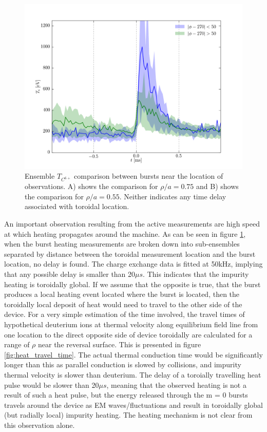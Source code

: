 \begin{figure}
	\centering
	\includegraphics[width = 1.\linewidth]{./m0_and_impurity_heating/m0_no_delay.png}
	\caption{Ensemble $T_{C^{6+}}$ comparison between bursts near the location of observations. A) shows the comparison for $\rho/a = 0.75$ and B) shows the comparison for $\rho/a = 0.55$. Neither indicates any time delay associated with toroidal location.}\label{fig:m0_no_delay}
\end{figure}


An important observation resulting from the active measurements are high speed at which heating propagates around the machine. As can be seen in figure \ref{fig:m0_no_delay}, when the burst heating measurements are broken down into sub-ensembles separated by distance between the toroidal measurement location and the burst location, no delay is found. The charge exchange data is fitted at 50kHz, implying that any possible delay is smaller than 20$\mu s$. This indicates that the impurity heating is toroidally global. If we assume that the opposite is true, that the burst produces a local heating event located where the burst is located, then the toroidally local deposit of heat would need to travel to the other side of the device. For a very simple estimation of the time involved, the travel times of hypothetical deuterium ions at thermal velocity along equilibrium field line from one location to the direct opposite side of device toroidally are calculated for a range of $\rho$ near the reversal surface. This is presented in figure \ref{fig:heat_travel_time}. The actual thermal conduction time would be significantly longer than this as parallel conduction is slowed by collisions, and impurity thermal velocity is slower than deuterium. The delay of a toroially travelling heat pulse would be slower than 20$\mu s$, meaning that the observed heating is not a result of such a heat pulse, but the energy released through the m = 0 bursts travels around the device as EM waves/fluctuations and result in toroidally global (but radially local) impurity heating. The heating mechanism is not clear from this observation alone.

